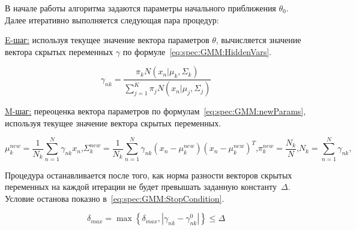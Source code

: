 В начале работы алгоритма задаются параметры начального приближения $\theta_0$. Далее итеративно выполняется следующая пара процедур:

\uline{E-шаг:} используя текущее значение вектора параметров $\theta$, вычисляется значение вектора скрытых переменных $\gamma$ по формуле~\eqref{eq:spec:GMM:HiddenVars}.

\begin{equation} \label{eq:spec:GMM:HiddenVars}
\gamma_{nk} = \frac{\pi_k N(x_n|\mu_k,\Sigma_k)}{\sum_{j=1}^{K} \pi_j N(x_n|\mu_j,\Sigma_j)}
\end{equation}

\uline{M-шаг:} переоценка вектора параметров по формулам~\eqref{eq:spec:GMM:newParams}, используя текущее значение вектора скрытых переменных.

\begin{subequations} \label{eq:spec:GMM:newParams}
\begin{equation} \label{eq:spec:GMM:newMu}
\mu_k^{new} = \frac{1}{N_k} \sum_{n=1}^{N} \gamma_{nk} x_n \text{,}
\end{equation}
\begin{equation} \label{eq:spec:GMM:newSigma}
\Sigma_k^{new} = \frac{1}{N_k} \sum_{n=1}^{N} \gamma_{nk} (x_n - \mu_k^{new})(x_n-\mu_k^{new})^T \text{,}
\end{equation}
\begin{equation} \label{eq:spec:GMM:newPi}
\pi_k^{new} = \frac{N_k}{N} \text{,}
\end{equation}
\begin{equation} \label{eq:spec:GMM:newN}
N_k = \sum_{n=1}^{N} \gamma_{nk} \text{,}
\end{equation}
\end{subequations}

Процедура останавливается после того, как норма разности векторов скрытых переменных на каждой итерации не будет превышать заданную константу~$\Delta$. Условие останова показно в~\eqref{eq:spec:GMM:StopCondition}.

\begin{equation} \label{eq:spec:GMM:StopCondition}
\delta_{max} = \max \left\{\delta_{max},|\gamma_{nk} - \gamma_{nk}^0|\right\} \leq\Delta
\end{equation}